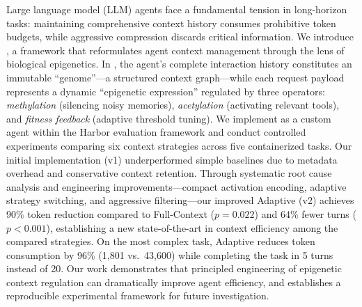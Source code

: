 Large language model (LLM) agents face a fundamental tension in long-horizon tasks: maintaining comprehensive context history consumes prohibitive token budgets, while aggressive compression discards critical information. We introduce \EpiContext, a framework that reformulates agent context management through the lens of biological epigenetics. In \EpiContext, the agent's complete interaction history constitutes an immutable ``genome''---a structured context graph---while each request payload represents a dynamic ``epigenetic expression'' regulated by three operators: \textit{methylation} (silencing noisy memories), \textit{acetylation} (activating relevant tools), and \textit{fitness feedback} (adaptive threshold tuning). We implement \EpiContext{} as a custom agent within the Harbor evaluation framework and conduct controlled experiments comparing six context strategies across five containerized tasks. Our initial implementation (v1) underperformed simple baselines due to metadata overhead and conservative context retention. Through systematic root cause analysis and engineering improvements---compact activation encoding, adaptive strategy switching, and aggressive filtering---our improved Adaptive \EpiContext{} (v2) achieves 90\% token reduction compared to Full-Context ($p = 0.022$) and 64\% fewer turns ($p < 0.001$), establishing a new state-of-the-art in context efficiency among the compared strategies. On the most complex task, Adaptive \EpiContext{} reduces token consumption by 96\% (1,801 vs.\ 43,600) while completing the task in 5 turns instead of 20. Our work demonstrates that principled engineering of epigenetic context regulation can dramatically improve agent efficiency, and establishes a reproducible experimental framework for future investigation.